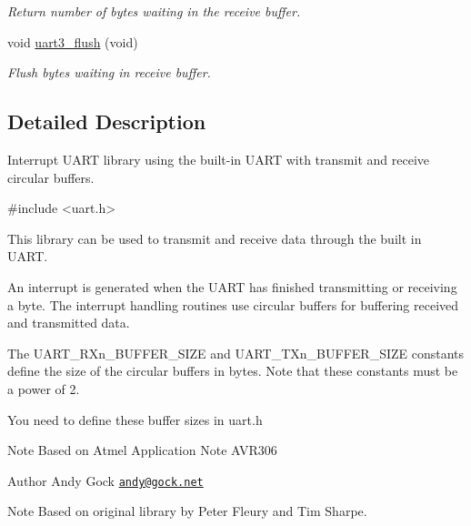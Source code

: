 \begin{DoxyCompactItemize}
\begin{DoxyCompactList}\small\item\em Return number of bytes waiting in the receive buffer. \end{DoxyCompactList}\item 
\hypertarget{group__avr-uart_gab0acffb07262f22021d7067471df5040}{void \hyperlink{group__avr-uart_gab0acffb07262f22021d7067471df5040}{uart3\-\_\-flush} (void)}\label{group__avr-uart_gab0acffb07262f22021d7067471df5040}

\begin{DoxyCompactList}\small\item\em Flush bytes waiting in receive buffer. \end{DoxyCompactList}\end{DoxyCompactItemize}


\subsection{Detailed Description}
Interrupt U\-A\-R\-T library using the built-\/in U\-A\-R\-T with transmit and receive circular buffers. 
\begin{DoxyCode}
\textcolor{preprocessor}{ #include <uart.h>} 
\end{DoxyCode}


This library can be used to transmit and receive data through the built in U\-A\-R\-T.

An interrupt is generated when the U\-A\-R\-T has finished transmitting or receiving a byte. The interrupt handling routines use circular buffers for buffering received and transmitted data.

The U\-A\-R\-T\-\_\-\-R\-Xn\-\_\-\-B\-U\-F\-F\-E\-R\-\_\-\-S\-I\-Z\-E and U\-A\-R\-T\-\_\-\-T\-Xn\-\_\-\-B\-U\-F\-F\-E\-R\-\_\-\-S\-I\-Z\-E constants define the size of the circular buffers in bytes. Note that these constants must be a power of 2.

You need to define these buffer sizes in uart.\-h

\begin{DoxyNote}{Note}
Based on Atmel Application Note A\-V\-R306 
\end{DoxyNote}
\begin{DoxyAuthor}{Author}
Andy Gock \href{mailto:andy@gock.net}{\tt andy@gock.\-net} 
\end{DoxyAuthor}
\begin{DoxyNote}{Note}
Based on original library by Peter Fleury and Tim Sharpe. 
\end{DoxyNote}


